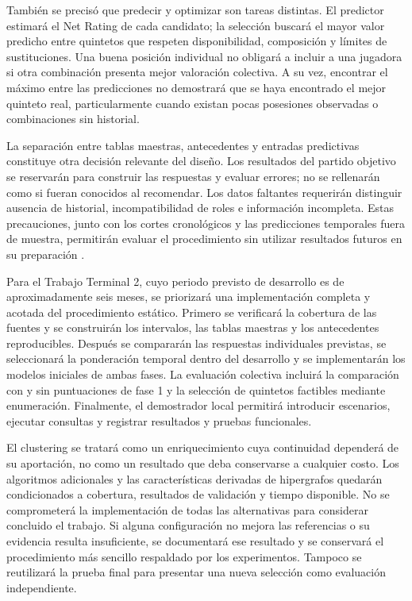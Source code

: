 También se precisó que predecir y optimizar son tareas distintas. El predictor estimará el Net Rating de cada candidato; la selección buscará el mayor valor predicho entre quintetos que respeten disponibilidad, composición y límites de sustituciones. Una buena posición individual no obligará a incluir a una jugadora si otra combinación presenta mejor valoración colectiva. A su vez, encontrar el máximo entre las predicciones no demostrará que se haya encontrado el mejor quinteto real, particularmente cuando existan pocas posesiones observadas o combinaciones sin historial.

La separación entre tablas maestras, antecedentes y entradas predictivas constituye otra decisión relevante del diseño. Los resultados del partido objetivo se reservarán para construir las respuestas y evaluar errores; no se rellenarán como si fueran conocidos al recomendar. Los datos faltantes requerirán distinguir ausencia de historial, incompatibilidad de roles e información incompleta. Estas precauciones, junto con los cortes cronológicos y las predicciones temporales fuera de muestra, permitirán evaluar el procedimiento sin utilizar resultados futuros en su preparación \cite{sklearnCommonPitfallsPonderacion,cawley2010selection}.

Para el Trabajo Terminal 2, cuyo periodo previsto de desarrollo es de aproximadamente seis meses, se priorizará una implementación completa y acotada del procedimiento estático. Primero se verificará la cobertura de las fuentes y se construirán los intervalos, las tablas maestras y los antecedentes reproducibles. Después se compararán las respuestas individuales previstas, se seleccionará la ponderación temporal dentro del desarrollo y se implementarán los modelos iniciales de ambas fases. La evaluación colectiva incluirá la comparación con y sin puntuaciones de fase 1 y la selección de quintetos factibles mediante enumeración. Finalmente, el demostrador local permitirá introducir escenarios, ejecutar consultas y registrar resultados y pruebas funcionales.

El clustering se tratará como un enriquecimiento cuya continuidad dependerá de su aportación, no como un resultado que deba conservarse a cualquier costo. Los algoritmos adicionales y las características derivadas de hipergrafos quedarán condicionados a cobertura, resultados de validación y tiempo disponible. No se comprometerá la implementación de todas las alternativas para considerar concluido el trabajo. Si alguna configuración no mejora las referencias o su evidencia resulta insuficiente, se documentará ese resultado y se conservará el procedimiento más sencillo respaldado por los experimentos. Tampoco se reutilizará la prueba final para presentar una nueva selección como evaluación independiente.

